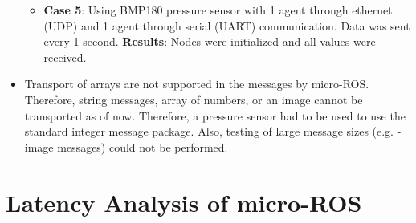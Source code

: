 \documentclass[%
xelatex,
	oneside,		%
	12pt,			%
	parskip=half,	%
	abstracton,
	chapterprefix=true%
    appendixprefix=true]
{scrbook}
\begin{document}
\begin{itemize}
\begin{itemize}
\item {\bfseries Case 5}: Using BMP180 pressure sensor with 1 agent through ethernet (UDP) and 1 agent through serial (UART) communication.
Data was sent every 1 second. \linebreak
{\bfseries Results}: Nodes were initialized and all values were received.
\end{itemize}
\item Transport of arrays are not supported in the messages by micro-ROS. Therefore, string messages, array of numbers, or an image cannot be transported as of now. Therefore, a pressure sensor had to be used to use the standard integer message package. Also, testing of large message sizes (e.g. - image messages) could not be performed.

\end{itemize}
\section{Latency Analysis of micro-ROS}
\end{document}
